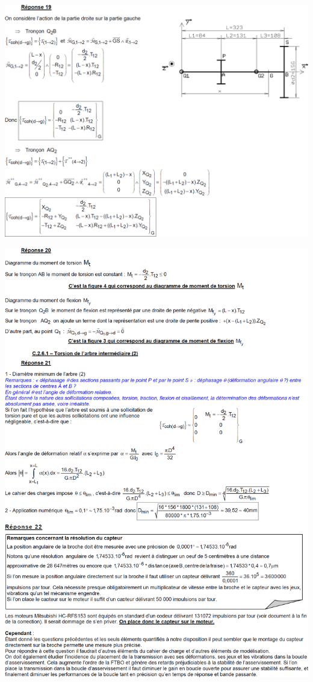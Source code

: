 \documentclass[10pt,fleqn]{article} %
\begin{document}
\newpage
\begin{center}
\includegraphics[width=\linewidth]{images/cor_01}
\end{center}

\begin{center}
\includegraphics[width=\linewidth]{images/cor_02}
\end{center}
\end{document}
